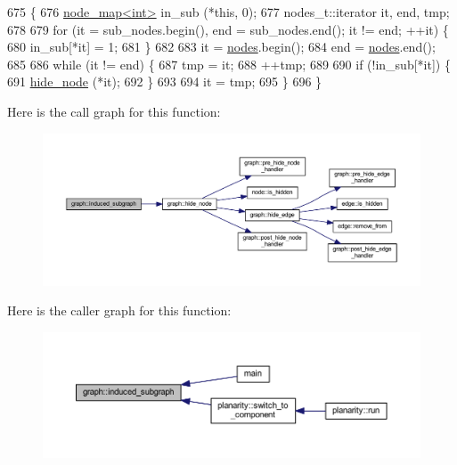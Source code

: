 \begin{DoxyCode}
675 \{
676     \mbox{\hyperlink{classnode__map}{node\_map<int>}} in\_sub (*\textcolor{keyword}{this}, 0);
677     nodes\_t::iterator it, end, tmp;
678 
679     \textcolor{keywordflow}{for} (it = sub\_nodes.begin(), end = sub\_nodes.end(); it != end; ++it) \{
680     in\_sub[*it] = 1;
681     \}
682 
683     it = \mbox{\hyperlink{classgraph_a4ea0592e8eb7c26c5abad24546907726}{nodes}}.begin();
684     end = \mbox{\hyperlink{classgraph_a4ea0592e8eb7c26c5abad24546907726}{nodes}}.end();
685     
686     \textcolor{keywordflow}{while} (it != end) \{
687     tmp = it;
688     ++tmp;
689 
690     \textcolor{keywordflow}{if} (!in\_sub[*it]) \{
691         \mbox{\hyperlink{classgraph_a214618b5e3c02695779350532506e225}{hide\_node}} (*it);
692     \}
693 
694     it = tmp;
695     \}
696 \}
\end{DoxyCode}
Here is the call graph for this function\+:
\nopagebreak
\begin{figure}[H]
\begin{center}
\leavevmode
\includegraphics[width=350pt]{classgraph_a15b766094bb0b97ef53e06e7c26b2197_cgraph}
\end{center}
\end{figure}
Here is the caller graph for this function\+:
\nopagebreak
\begin{figure}[H]
\begin{center}
\leavevmode
\includegraphics[width=350pt]{classgraph_a15b766094bb0b97ef53e06e7c26b2197_icgraph}
\end{center}
\end{figure}
\mbox{\label{classgraph_a1085478258cf370dcfbe283e834df339}} 
